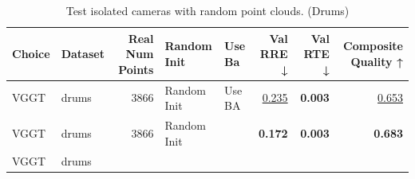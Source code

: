 \begin{table}[H]
\caption{Test isolated cameras with random point clouds. (Drums)}
\label{tab:06_isolated_cams_drums}
\footnotesize
\begin{tabular}{llrllrrr}
\toprule
Choice & Dataset & Real Num Points & Random Init & Use Ba & Val RRE ↓ & Val RTE ↓ & Composite Quality ↑ \\
\midrule
VGGT & drums & 3866 & Random Init & Use BA & \underline{0.235} & \textbf{0.003} & \underline{0.653} \\
VGGT & drums & 3866 & Random Init &  & \textbf{0.172} & \textbf{0.003} & \textbf{0.683} \\
VGGT & drums &  &  &  &  &  &  \\
\bottomrule
\end{tabular}
\end{table}